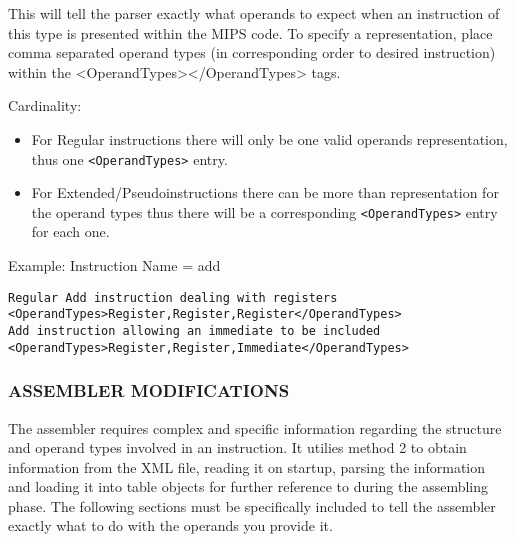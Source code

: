 \begin{enumerate}
This will tell the parser exactly what operands to expect when an instruction of this type is presented within the MIPS code. To specify a representation, place comma separated operand types (in corresponding order to desired instruction) within the <OperandTypes></OperandTypes> tags.

Cardinality:

\begin{itemize}
\item For Regular instructions there will only be one valid operands representation, thus one \verb"<OperandTypes>" entry.
\item For Extended/Pseudoinstructions there can be more than representation for the operand types thus there will be a corresponding \verb"<OperandTypes>" entry for each one.
\end{itemize}

Example: Instruction Name = add

\begin{verbatim}
Regular Add instruction dealing with registers
<OperandTypes>Register,Register,Register</OperandTypes>
Add instruction allowing an immediate to be included
<OperandTypes>Register,Register,Immediate</OperandTypes>
\end{verbatim}

\end{enumerate}



\subsubsection{ASSEMBLER MODIFICATIONS}


The assembler requires complex and specific information regarding the structure and operand types involved in an instruction. It utilies method 2 to obtain information from the XML file, reading it on startup, parsing the information and loading it into table objects for further reference to during the assembling phase. The following sections must be specifically included to tell the assembler exactly what to do with the operands you provide it.



